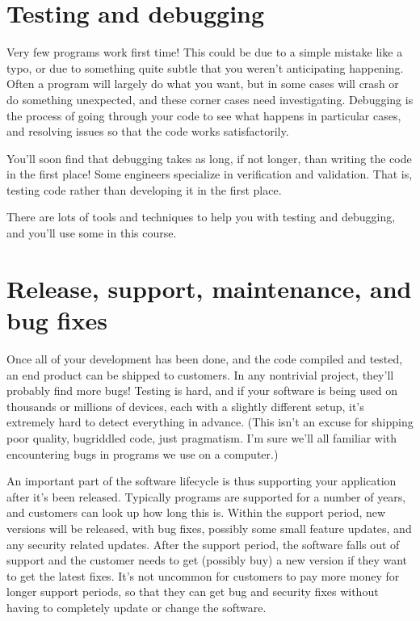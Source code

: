 \documentclass[letterpaper,10pt,british]{sphinxmanual}
\begin{document}
\section{Testing and debugging}
\label{\detokenize{chapters/software_lifecycle/testing_and_debugging:testing-and-debugging}}\label{\detokenize{chapters/software_lifecycle/testing_and_debugging::doc}}
\sphinxAtStartPar
Very few programs work first time! This could be due to a simple mistake like a typo, or due to something quite subtle that you weren’t anticipating happening. Often a program will largely do what you want, but in some cases will crash or do something unexpected, and these corner cases need investigating. Debugging is the process of going through your code to see what happens in particular cases, and resolving issues so that the code works satisfactorily.

\sphinxAtStartPar
You’ll soon find that debugging takes as long, if not longer, than writing the code in the first place! Some engineers specialize in verification and validation. That is, testing code rather than developing it in the first place.

\sphinxAtStartPar
There are lots of tools and techniques to help you with testing and debugging, and you’ll use some in this course.

\sphinxstepscope


\section{Release, support, maintenance, and bug fixes}
\label{\detokenize{chapters/software_lifecycle/release:release-support-maintenance-and-bug-fixes}}\label{\detokenize{chapters/software_lifecycle/release::doc}}
\sphinxAtStartPar
Once all of your development has been done, and the code compiled and tested, an end product can be shipped to customers. In any non\sphinxhyphen{}trivial project, they’ll probably find more bugs! Testing is hard, and if your software is being used on thousands or millions of devices, each with a slightly different setup, it’s extremely hard to detect everything in advance. (This isn’t an excuse for shipping poor quality, bug\sphinxhyphen{}riddled code, just pragmatism. I’m sure we’ll all familiar with encountering bugs in programs we use on a computer.)

\sphinxAtStartPar
An important part of the software lifecycle is thus supporting your application after it’s been released. Typically programs are supported for a number of years, and customers can look up how long this is. Within the support period, new versions will be released, with bug fixes, possibly some small feature updates, and any security related updates. After the support period, the software falls out of support and the customer needs to get (possibly buy) a new version if they want to get the latest fixes. It’s not uncommon for customers to pay more money for longer support periods, so that they can get bug and security fixes without having to completely update or change the software.
\end{document}
